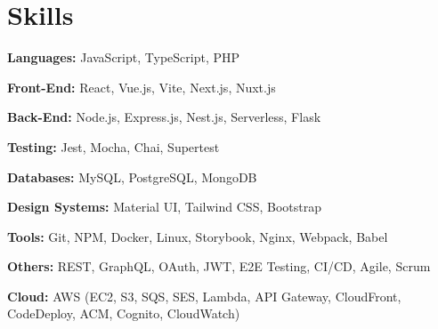 \documentclass[letterpaper,12pt]{article}
\newcommand{\resumeSubHeadingListStart}{\begin{itemize}[leftmargin=0in, label={}]}
\newcommand{\resumeSubHeadingListEnd}{\end{itemize}}
\begin{document}
\section{Skills}
\vspace{2pt}
\resumeSubHeadingListStart
\small{\item{

                \textbf{Languages:}{ JavaScript, TypeScript, PHP} \\ \vspace{3pt}

                \textbf{Front-End:}{ React, Vue.js, Vite, Next.js, Nuxt.js} \\ \vspace{3pt}

                \textbf{Back-End:}{ Node.js, Express.js, Nest.js, Serverless, Flask} \\ \vspace{3pt}

                \textbf{Testing:}{ Jest, Mocha, Chai, Supertest} \\ \vspace{3pt}

                \textbf{Databases:}{ MySQL, PostgreSQL, MongoDB} \\ \vspace{3pt}

                \textbf{Design Systems:}{ Material UI, Tailwind CSS, Bootstrap} \\ \vspace{3pt}

                \textbf{Tools:}{ Git, NPM, Docker, Linux, Storybook, Nginx, Webpack, Babel} \\ \vspace{3pt}

                \textbf{Others:}{ REST, GraphQL, OAuth, JWT, E2E Testing, CI/CD, Agile, Scrum} \\ \vspace{3pt}

                \textbf{Cloud:}{ AWS (EC2, S3, SQS, SES, Lambda, API Gateway, CloudFront, CodeDeploy, ACM, Cognito, CloudWatch)} \\ \vspace{3pt}
          }}
\resumeSubHeadingListEnd

\end{document}
